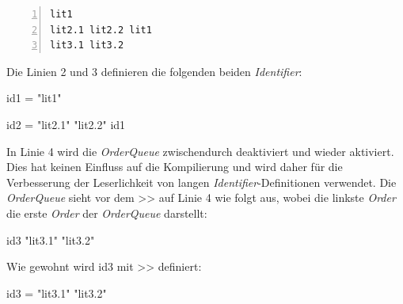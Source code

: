 \begin{minipage}{\linewidth}
\begin{multicols}{2}
\begin{lstlisting}[language=QHS, label=eg:howto_id1-3, caption=Beispiel zu gewöhnlichen \textit{Identifier}-Definitionen, numbers=left, stepnumber=1]
lit1
lit2.1 lit2.2 lit1
lit3.1 lit3.2
\end{lstlisting}
\columnbreak

Die Linien 2 und 3 definieren die folgenden beiden \textit{Identifier}: \break
\centerline{\selectListingFont id1 = "lit1"{}}
\centerline{\selectListingFont id2 = "lit2.1"{} "lit2.2"{} id1}
In Linie 4 wird die \textit{OrderQueue} zwischendurch deaktiviert und wieder aktiviert.
Dies hat keinen Einfluss auf die Kompilierung und wird daher für die Verbesserung der Leserlichkeit von langen \textit{Identifier}-Definitionen verwendet.
Die \textit{OrderQueue} sieht vor dem {\selectListingFont >>} auf Linie 4 wie folgt aus, wobei die linkste \textit{Order} die erste \textit{Order} der \textit{OrderQueue} darstellt:  \break
\centerline{\selectListingFont id3 "lit3.1"{} "lit3.2"{}}
Wie gewohnt wird {\selectListingFont id3} mit {\selectListingFont >>} definiert: \break
\centerline{\selectListingFont id3 = "lit3.1"{} "lit3.2"{}}
\end{multicols}
\end{minipage}
\vspace{\baselineskip}

